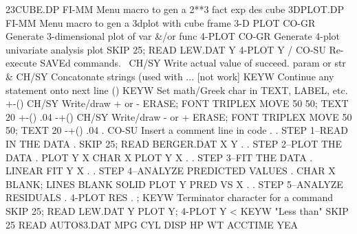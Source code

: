 23CUBE.DP                   FI-MM Menu macro to gen a 2**3 fact exp des cube
3DPLOT.DP                   FI-MM Menu macro to gen a 3dplot with cube frame
3-D PLOT                    CO-GR Generate 3-dimensional plot of var &/or func
4-PLOT                      CO-GR Generate 4-plot univariate analysis plot
                                  SKIP 25; READ LEW.DAT Y
                                  4-PLOT Y
/                           CO-SU Re-execute SAVEd commands.
\                           CH/SY Write actual value of succeed. param or str
&                           CH/SY Concatonate strings (used with \)
...      [not work]         KEYW  Continue any statement onto next line
()                          KEYW  Set math/Greek char in TEXT, LABEL, etc.
+-()                        CH/SY Write/draw + or -
                                  ERASE; FONT TRIPLEX
                                  MOVE 50 50; TEXT 20 +-() .04
-+()                        CH/SY Write/draw - or +
                                  ERASE; FONT TRIPLEX
                                  MOVE 50 50; TEXT 20 -+() .04
.                           CO-SU Insert a comment line in code
                                  .
                                  . STEP 1--READ IN THE DATA
                                  .
                                  SKIP 25; READ BERGER.DAT X Y
                                  .
                                  . STEP 2--PLOT THE DATA
                                  .
                                  PLOT Y X
                                  CHAR X
                                  PLOT Y X
                                  .
                                  . STEP 3--FIT THE DATA
                                  .
                                  LINEAR FIT Y X
                                  .
                                  . STEP 4--ANALYZE PREDICTED VALUES
                                  .
                                  CHAR X BLANK; LINES BLANK SOLID
                                  PLOT Y PRED VS X
                                  .
                                  . STEP 5--ANALYZE RESIDUALS
                                  .
                                  4-PLOT RES
                                  .
;                           KEYW  Terminator character for a command
                                  SKIP 25; READ LEW.DAT Y
                                  PLOT Y; 4-PLOT Y
<                           KEYW  "Less than"
                                  SKIP 25
                                  READ AUTO83.DAT MPG CYL DISP HP WT ACCTIME YEA
